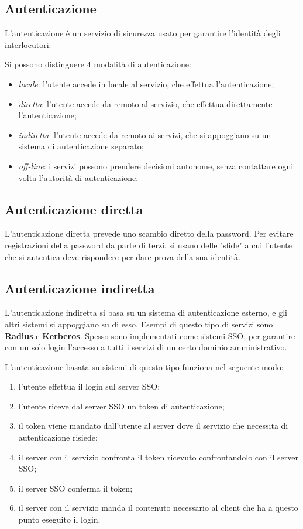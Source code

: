\documentclass[a4paper, 11pt]{article}
\begin{document}
\begin{multicols}{2}
		\section{Autenticazione}
		L'autenticazione è un servizio di sicurezza usato per garantire l'identità degli interlocutori.
		
		Si possono distinguere 4 modalità di autenticazione:
		\begin{itemize}
			\item \textit{locale}: l'utente accede in locale al servizio, che effettua l'autenticazione;
			\item \textit{diretta}: l'utente accede da remoto al servizio, che effettua direttamente l'autenticazione;
			\item \textit{indiretta}: l'utente accede da remoto ai servizi, che si appoggiano su un sistema di autenticazione separato;
			\item \textit{off-line}: i servizi possono prendere decisioni autonome, senza contattare ogni volta l'autorità di autenticazione.
		\end{itemize}
	
	\subsection{Autenticazione diretta}
	L'autenticazione diretta prevede uno scambio diretto della password. Per evitare registrazioni della password da parte di terzi, si usano delle "sfide" a cui l'utente che si autentica deve rispondere per dare prova della sua identità.
	
	\subsection{Autenticazione indiretta}
	L'autenticazione indiretta si basa su un sistema di autenticazione esterno,  e gli altri sistemi si appoggiano su di esso. Esempi di questo tipo di servizi sono \textbf{Radius} e \textbf{Kerberos}. Spesso sono implementati come sistemi SSO, per garantire con un solo login l'accesso a tutti i servizi di un certo dominio amministrativo.
	
	L'autenticazione basata su sistemi di questo tipo funziona nel seguente modo:
	\begin{enumerate}
		\item l'utente effettua il login sul server SSO;
		\item l'utente riceve dal server SSO un token di autenticazione;
		\item il token viene mandato dall'utente al server dove il servizio che necessita di autenticazione risiede;
		\item il server con il servizio confronta il token ricevuto confrontandolo con il server SSO;
		\item il server SSO conferma il token;
		\item il server con il servizio manda il contenuto necessario al client che ha a questo punto eseguito il login.
	\end{enumerate}


\end{multicols}
\end{document}
